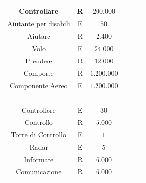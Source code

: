 \begin{tabular}{ | c  c  c | c  c  c | }
	\hline
	\textsf{\small Controllare} & \textsf{\small R} & \textsf{\small $ 200.000 $} & \textsf{\small } & \textsf{\small } & \textsf{\small $ $}\\
	\hline
	\textsf{\small Aiutante per disabili} & \textsf{\small E} & \textsf{\small $ 50 $} & \textsf{\small } & \textsf{\small } & \textsf{\small $ $}\\
	\hline
	\textsf{\small Aiutare} & \textsf{\small R} & \textsf{\small $ 2.400 $} & \textsf{\small } & \textsf{\small } & \textsf{\small $ $}\\
	\hline
	\textsf{\small Volo} & \textsf{\small E} & \textsf{\small $ 24.000 $} & \textsf{\small } & \textsf{\small } & \textsf{\small $ $}\\
	\hline
	\textsf{\small Prendere} & \textsf{\small R} & \textsf{\small $ 12.000 $} & \textsf{\small } & \textsf{\small } & \textsf{\small $ $}\\
	\hline
	\textsf{\small Comporre} & \textsf{\small R} & \textsf{\small $ 1.200.000 $} & \textsf{\small } & \textsf{\small } & \textsf{\small $ $}\\
	\hline
	\textsf{\small Componente Aereo} & \textsf{\small E} & \textsf{\small $ 1.200.000 $} & \textsf{\small } & \textsf{\small } & \textsf{\small $ $}\\
	\hline
	\textsf{\small } & \textsf{\small } & \textsf{\small $ $} & \textsf{\small } & \textsf{\small } & \textsf{\small $ $} \\
	\hline
	\textsf{\small Controllore} & \textsf{\small E} & \textsf{\small $ 30 $} & \textsf{\small } & \textsf{\small } & \textsf{\small $ $}\\
	\hline
	\textsf{\small Controllo} & \textsf{\small R} & \textsf{\small $ 5.000 $} & \textsf{\small } & \textsf{\small } & \textsf{\small $ $}\\
	\hline
	\textsf{\small Torre di Controllo} & \textsf{\small E} & \textsf{\small $ 1 $} & \textsf{\small } & \textsf{\small } & \textsf{\small $ $}\\
	\hline
	\textsf{\small Radar} & \textsf{\small E} & \textsf{\small $ 5 $} & \textsf{\small } & \textsf{\small } & \textsf{\small $ $}\\
	\hline
	\textsf{\small Informare} & \textsf{\small R} & \textsf{\small $ 6.000 $} & \textsf{\small } & \textsf{\small } & \textsf{\small $ $}\\
	\hline
	\textsf{\small Comunicazione} & \textsf{\small R} & \textsf{\small $ 6.000 $} & \textsf{\small } & \textsf{\small } & \textsf{\small $ $}\\
	\hline

\end{tabular}
